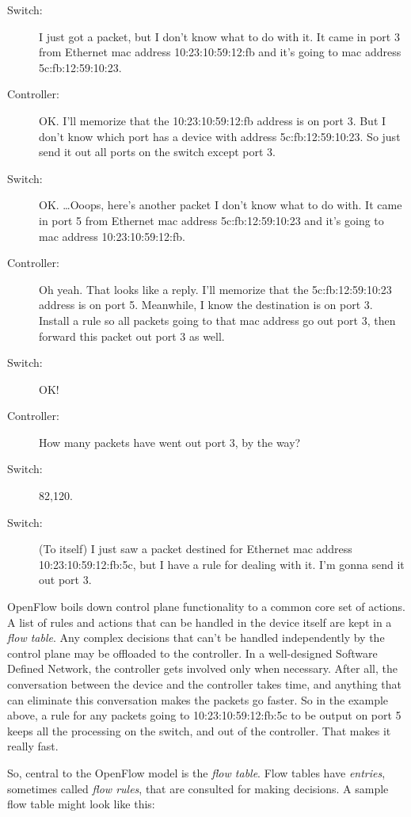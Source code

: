 \begin{description}
\item[Switch:] I just got a packet, but I don't know what to do with it.
It came in port 3 from Ethernet mac address 10:23:10:59:12:fb and it's going to mac address 5c:fb:12:59:10:23.
\item[Controller:] OK.    
I'll memorize that the 10:23:10:59:12:fb address is on port 3.
But I don't know which port has a device with address 5c:fb:12:59:10:23.
So just send it out all ports on the switch except port 3.  
\item[Switch:] OK. \ldots Ooops, here's another packet I don't know what to do with.  
It came in port 5 from Ethernet mac address 5c:fb:12:59:10:23 and it's going to mac address 10:23:10:59:12:fb.
\item[Controller:]  Oh yeah.  
That looks like a reply.  
I'll memorize that the 5c:fb:12:59:10:23 address is on port 5.
Meanwhile, I know the destination is on port 3.  
Install a rule so all packets going to that mac address go out port 3, then forward this packet out port 3 as well.  
\item[Switch:] OK!
\item[Controller:] How many packets have went out port 3, by the way?
\item[Switch:] 82,120.
\item[Switch:] (To itself) I just saw a packet destined for Ethernet mac address 10:23:10:59:12:fb:5c, but I have a rule for dealing with it.  I'm gonna send it out port 3.  
\end{description}

OpenFlow boils down control plane functionality to a common core set of actions.
A list of rules and actions that can be handled in the device itself are kept in a \textit{flow table}.
Any complex decisions that can't be handled independently by the control plane may be offloaded to the controller.  
In a well-designed Software Defined Network, the controller gets involved only when necessary.
After all, the conversation between the device and the controller takes time, and anything that can 
eliminate this conversation makes the packets go faster.
So in the example above, a rule for any packets going to 10:23:10:59:12:fb:5c to be output on port 5 keeps all the processing on the switch, and out of the controller.  
That makes it really fast.  

So, central to the OpenFlow model is the \textit{flow table}.  
Flow tables have \textit{entries}, sometimes called \textit{flow rules}, that are consulted for making decisions.
A sample flow table might look like this:

